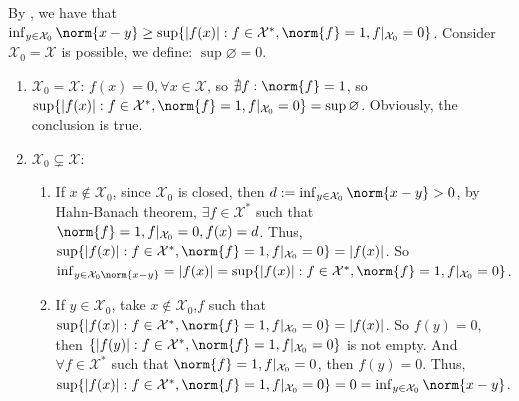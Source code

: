 \documentclass{ctexart}
\begin{document}
\begin{solution}
 By , we have that \(\inf_{y \in \mathcal{X}_0}\norm{x-y} \geq \sup\{|f(x)|:f \in \mathcal{X}^*, \norm{f}=1, f|_{\mathcal{X}_0}=0\} \).
 Consider \(\mathcal{X}_0=\mathcal{X}\) is possible, we define: \(\sup \varnothing =0\).
 \begin{enumerate}
   \item \(\mathcal{X}_0=\mathcal{X}\): \(f(x)=0, \forall x \in \mathcal{X}\), so \(\nexists f: \norm{f}=1\), so \(\sup \{|f(x)|: f \in \mathcal{X}^*, \norm{f}=1, f|_{\mathcal{X}_0}=0\}= \sup \varnothing\).
     Obviously, the conclusion is true.
   \item \(\mathcal{X}_0 \subsetneq \mathcal{X}\):\begin{enumerate}
     \item If \(x \notin \mathcal{X}_0\), since \(\mathcal{X}_0\) is closed, then
       \(d:=\inf_{y \in \mathcal{X}_0}\norm{x-y} > 0\), by Hahn-Banach theorem, \(\exists f \in \mathcal{X}^*\) such that
       \(\norm{f}=1, f|_{\mathcal{X}_0}=0, f(x)=d\). Thus, \( \sup\{|f(x)|:f \in \mathcal{X}^*, \norm{f}=1, f|_{\mathcal{X}_0}=0\}=|f(x)| \).
       So \(\inf_{y \in \mathcal{X}_0 \norm{x-y}}= |f(x)|= \sup\{|f(x)|:f \in \mathcal{X}^*, \norm{f}=1, f|_{\mathcal{X}_0}=0\} \).
     \item If \(y \in \mathcal{X}_0\), take \(x \notin \mathcal{X}_0\),\(f\) such that \( \sup\{|f(x)|:f \in \mathcal{X}^*, \norm{f}=1, f|_{\mathcal{X}_0}=0\}=|f(x)| \).
       So \(f(y)=0\), then  \(\{|f(y)|: f \in \mathcal{X}^*, \norm{f}=1, f|_{\mathcal{X}_0}=0\}\) is not empty.
       And \(\forall f \in \mathcal{X}^* \) such that \(\norm{f}=1, f|_{\mathcal{X}_0}=0\), then \(f(y)=0\). 
       Thus,  \( \sup\{|f(x)|:f \in \mathcal{X}^*, \norm{f}=1, f|_{\mathcal{X}_0}=0\}=0=\inf_{y \in \mathcal{X}_0}\norm{x-y} \).


   \end{enumerate}

 \end{enumerate}
\end{solution}
\end{document}
